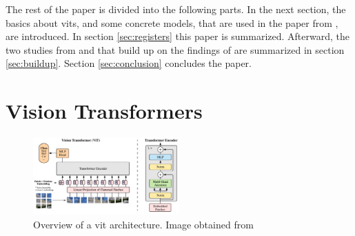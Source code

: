 \documentclass[conference]{IEEEtran}
\begin{document}
  The rest of the paper is divided into the following parts. In the next section, the basics about \acp{vit}, and some concrete models, that are used in the paper from \citeauthor{registers} \cite{registers}, are introduced. In section \ref{sec:registers} this paper is summarized. Afterward, the two studies from \citeauthor{mamba-needs-registers} \cite{mamba-needs-registers} and \citeauthor{denoising} \cite{denoising} that build up on the findings of \citeauthor{registers} \cite{registers} are summarized in section \ref{sec:buildup}. Section \ref{sec:conclusion} concludes the paper.

  \section{Vision Transformers}
  \label{sec:vits}

  \begin{figure}
    \centering
    \includegraphics[width=0.5\textwidth]{figures/vit-architecture.png}
    \caption{Overview of a \ac{vit} architecture. Image obtained from \cite{visiontransformers2021}}
    \label{fig:vit-architecture}
  \end{figure}
\end{document}
